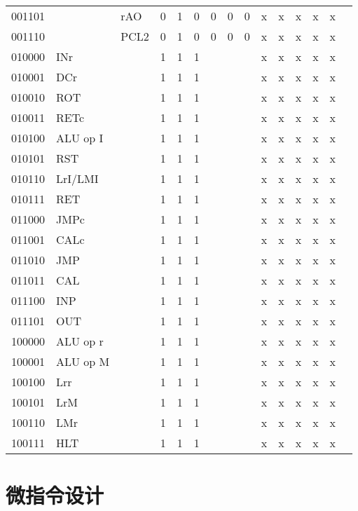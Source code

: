 \documentclass[10pt]{book}
\begin{document}
\begin{longtable}{|l|l|l|c|c|c|c|c|c|c|c|c|c|c|c|}
001101 	&			& rAO  		& 0 & 1 & 0   & 0 & 0 & 0   & x & x & x & x & x \\
001110 	&			& PCL2 		& 0 & 1 & 0   & 0 & 0 & 0   & x & x & x & x & x \\
010000	& INr		& 			& 1 & 1 & 1	  &   &   &     & x & x & x & x & x \\
010001	& DCr		& 			& 1 & 1 & 1	  &   &   &     & x & x & x & x & x \\
010010	& ROT		&			& 1 & 1 & 1	  &   &   &     & x & x & x & x & x \\
010011	& RETc		&			& 1 & 1 & 1	  &   &   &     & x & x & x & x & x \\
010100	& ALU op I 	& 			& 1 & 1 & 1	  &   &   &     & x & x & x & x & x \\
010101	& RST		&			& 1 & 1 & 1	  &   &   &     & x & x & x & x & x \\
010110	& LrI/LMI	&			& 1 & 1 & 1	  &   &   &     & x & x & x & x & x \\
010111	& RET		&			& 1 & 1 & 1	  &   &   &     & x & x & x & x & x \\
011000	& JMPc		&			& 1 & 1 & 1	  &   &   &     & x & x & x & x & x \\
011001	& CALc		&			& 1 & 1 & 1	  &   &   &     & x & x & x & x & x \\
011010	& JMP		&			& 1 & 1 & 1	  &   &   &     & x & x & x & x & x \\
011011	& CAL		&			& 1 & 1 & 1	  &   &   &     & x & x & x & x & x \\
011100	& INP		&			& 1 & 1 & 1	  &   &   &     & x & x & x & x & x \\
011101	& OUT		&			& 1 & 1 & 1	  &   &   &     & x & x & x & x & x \\
100000	& ALU op r 	&			& 1 & 1 & 1	  &   &   &     & x & x & x & x & x \\
100001	& ALU op M 	&			& 1 & 1 & 1	  &   &   &     & x & x & x & x & x \\
100100	& Lrr		&			& 1 & 1 & 1	  &   &   &     & x & x & x & x & x \\
100101	& LrM		&			& 1 & 1 & 1	  &   &   &     & x & x & x & x & x \\
100110	& LMr		&			& 1 & 1 & 1	  &   &   &     & x & x & x & x & x \\
100111	& HLT		&			& 1 & 1 & 1	  &   &   &     & x & x & x & x & x \\
\end{longtable}

\section{微指令设计}
\end{document}
